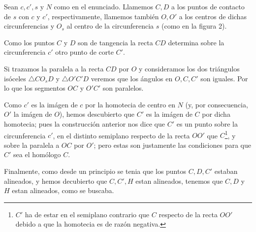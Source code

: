 \begin{sol}
	Sean $c,c'\!,s$ y $N$ como en el enunciado. Llamemos $C,D$ a los puntos de contacto de $s$ con $c$ y $c'$, respectivamente, llamemos también $O,O'$ a los centros de dichas circunferencias y $O_s$ al centro de la circunferencia $s$ (como en la figura 2).
	
	Como los puntos $C$ y $D$ son de tangencia la recta $CD$ determina sobre la circunferencia $c'\!$ otro punto de corte $C'$.
	
	Si trazamos la paralela a la recta $CD$ por $O$ y consideramos los dos triángulos isóceles $\triangle CO_sD$ y $\triangle O'C'D$ veremos que los ángulos en $O,C,C'$ son iguales. Por lo que los segmentos $OC$ y $O'C'$ son paralelos.
	
	Como $c'$ es la imágen de $c$ por la homotecia de centro en $N$ (y, por consecuencia, $O'$ la imágen de $O$), hemos descubierto que $C'$ es la imágen de $C$ por dicha homotecia;  pues la construcción anterior nos dice que $C'$ es un punto sobre la circunferencia $c'$, en el distinto semiplano respecto de la recta $OO'$ que $C$\footnote{$C'$ ha de estar en el semiplano contrario que $C$ respecto de la recta $OO'$ debido a que la homotecia es de razón negativa.}, y sobre la paralela a $OC$ por $O'$; pero estas son justamente las condiciones para que $C'$ sea el homólogo $C$.
	
	Finalmente, como desde un principio se tenia que los puntos $C,D,C'$ estaban alineados, y hemos decubierto que $C,C',H$ estan alineados, tenemos que $C,D$ y $H$ estan alineados, como se buscaba.
\end{sol}
